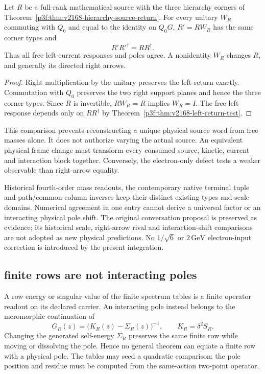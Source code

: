 \documentclass[12pt,a4paper]{article}
\begin{document}
\begin{proposition}
\label{p6:prop:v2191-right-arrow-nonuniqueness}
Let $R$ be a full-rank mathematical source with the three hierarchy corners
of Theorem~\ref{p3f:thm:v2168-hierarchy-source-return}. For every unitary
$W_R$ commuting with $Q_0$ and equal to the identity on $Q_0G$,
$R'=RW_R$ has the same corner types and
\[
 R'R'^\dagger=RR^\dagger.
\]
Thus all free left-current responses and poles agree. A nonidentity
$W_R$ changes $R$, and generally its directed right arrows.
\end{proposition}
\begin{proof}
Right multiplication by the unitary preserves the left return exactly.
Commutation with $Q_0$ preserves the two right support planes and hence
the three corner types. Since $R$ is invertible, $RW_R=R$ implies
$W_R=I$. The free left response depends only on $RR^\dagger$ by
Theorem~\ref{p3f:thm:v2168-left-return-test}.
\end{proof}

This comparison prevents reconstructing a unique physical source word
from free masses alone. It does not authorize varying the actual source.
An equivalent physical frame change must transform every consumed source,
kinetic, current and interaction block together. Conversely, the
electron-only defect tests a weaker observable than right-arrow equality.

Historical fourth-order mass readouts, the contemporary native terminal
tuple and path/common-column inverses keep their distinct existing types
and scale domains. Numerical agreement in one entry cannot derive a
universal factor or an interacting physical pole shift. The original
conversation proposal is preserved as evidence; its historical scale,
right-arrow rival and interaction-shift comparisons are not adopted as
new physical predictions. No $1/\sqrt6$ or $2\,\mathrm{GeV}$ electron-input
correction is introduced by the present integration.



\subsection{finite rows are not interacting poles}
\label{p6:sec:v164-finite-row-pole-boundary}

\begin{proposition}
\label{p6:prop:v164-finite-row-not-pole}
A row energy or singular value of the finite spectrum tables is a finite
operator readout on its declared carrier.  An interacting pole instead
belongs to the meromorphic continuation of
\[
 G_R(z)=\bigl(K_R(z)-\Sigma_R(z)\bigr)^{-1},
 \qquad K_R=\delta^2S_R.
\]
Changing the generated self-energy \(\Sigma_R\) preserves the same finite row
while moving or dissolving the pole.  Hence no general theorem can equate a
finite row with a physical pole.  The tables may seed a quadratic comparison;
the pole position and residue must be computed from the same-action two-point
operator.
\end{proposition}
\end{document}
